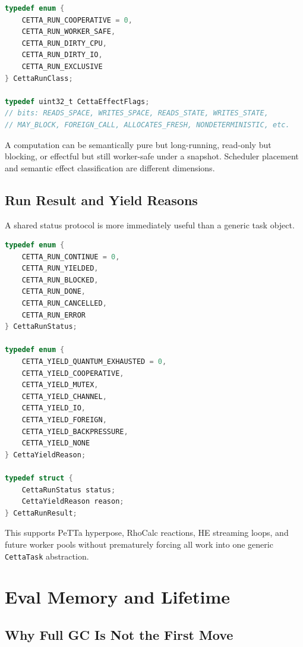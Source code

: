 \documentclass[11pt]{article}
\newcommand{\PeTTa}{PeTTa}
\newcommand{\RhoCalc}{RhoCalc}
\begin{document}
\begin{lstlisting}[language=C]
typedef enum {
    CETTA_RUN_COOPERATIVE = 0,
    CETTA_RUN_WORKER_SAFE,
    CETTA_RUN_DIRTY_CPU,
    CETTA_RUN_DIRTY_IO,
    CETTA_RUN_EXCLUSIVE
} CettaRunClass;

typedef uint32_t CettaEffectFlags;
// bits: READS_SPACE, WRITES_SPACE, READS_STATE, WRITES_STATE,
// MAY_BLOCK, FOREIGN_CALL, ALLOCATES_FRESH, NONDETERMINISTIC, etc.
\end{lstlisting}

A computation can be semantically pure but long-running, read-only but blocking, or effectful but still worker-safe under a snapshot.  Scheduler placement and semantic effect classification are different dimensions.

\subsection{Run Result and Yield Reasons}

A shared status protocol is more immediately useful than a generic task object.

\begin{lstlisting}[language=C]
typedef enum {
    CETTA_RUN_CONTINUE = 0,
    CETTA_RUN_YIELDED,
    CETTA_RUN_BLOCKED,
    CETTA_RUN_DONE,
    CETTA_RUN_CANCELLED,
    CETTA_RUN_ERROR
} CettaRunStatus;

typedef enum {
    CETTA_YIELD_QUANTUM_EXHAUSTED = 0,
    CETTA_YIELD_COOPERATIVE,
    CETTA_YIELD_MUTEX,
    CETTA_YIELD_CHANNEL,
    CETTA_YIELD_IO,
    CETTA_YIELD_FOREIGN,
    CETTA_YIELD_BACKPRESSURE,
    CETTA_YIELD_NONE
} CettaYieldReason;

typedef struct {
    CettaRunStatus status;
    CettaYieldReason reason;
} CettaRunResult;
\end{lstlisting}

This supports \PeTTa{} hyperpose, \RhoCalc{} reactions, HE streaming loops, and future worker pools without prematurely forcing all work into one generic \texttt{CettaTask} abstraction.

\section{Eval Memory and Lifetime}\label{sec:memory}

\subsection{Why Full GC Is Not the First Move}
\end{document}

